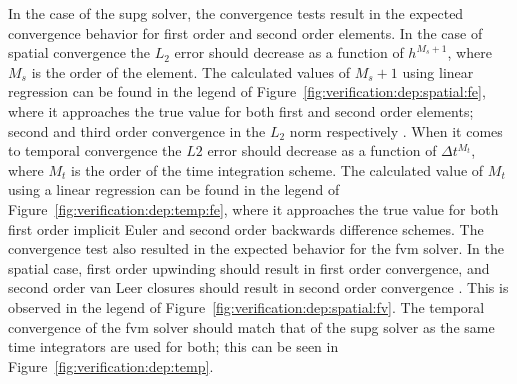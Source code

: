In the case of the \acrshort{supg} solver, the convergence tests result in the expected convergence behavior for first order and second order elements. In the case of spatial convergence the $L_{2}$ error should decrease as a function of $h^{M_{s}+1}$, where $M_{s}$ is the order of the element. The calculated values of $M_{s}+1$ using linear regression can be found in the legend of Figure~\ref{fig:verification:dep:spatial:fe}, where it approaches the true value for both first and second order elements; second and third order convergence in the $L_{2}$ norm respectively \cite{finite_element_method}. When it comes to temporal convergence the $L2$ error should decrease as a function of $\Delta t^{M_{t}}$, where $M_{t}$ is the order of the time integration scheme. The calculated value of $M_{t}$ using a linear regression can be found in the legend of Figure~\ref{fig:verification:dep:temp:fe}, where it approaches the true value for both first order implicit Euler and second order backwards difference schemes. The convergence test also resulted in the expected behavior for the \acrshort{fvm} solver. In the spatial case, first order upwinding should result in first order convergence, and second order van Leer closures should result in second order convergence \cite{finite_volume_methods}. This is observed in the legend of Figure~\ref{fig:verification:dep:spatial:fv}. The temporal convergence of the \acrshort{fvm} solver should match that of the \acrshort{supg} solver as the same time integrators are used for both; this can be seen in Figure~\ref{fig:verification:dep:temp}. 

